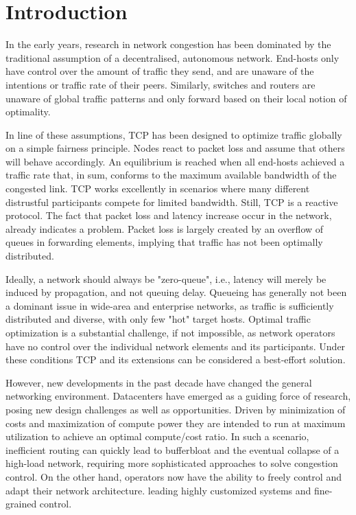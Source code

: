 \section{Introduction}
\label{sec:intro}

In the early years, research in network congestion has been dominated by the traditional assumption of a decentralised, autonomous network. End-hosts only have control over the amount of traffic they send, and are unaware of the intentions or traffic rate of their peers. Similarly, switches and routers are unaware of global traffic patterns and only forward based on their local notion of optimality.

In line of these assumptions, TCP has been designed to optimize traffic globally on a simple fairness principle. Nodes react to packet loss and assume that others will behave accordingly. An equilibrium is reached when all end-hosts achieved a traffic rate that, in sum, conforms to the maximum available bandwidth of the congested link.
TCP works excellently in scenarios where many different distrustful participants compete for limited bandwidth. Still, TCP is a reactive protocol. The fact that packet loss and latency increase occur in the network, already indicates a problem. Packet loss is largely created by an overflow of queues in forwarding elements, implying that traffic has not been optimally distributed. 

Ideally, a network should always be "zero-queue", i.e., latency will merely be induced by propagation, and not queuing delay. 
Queueing has generally not been a dominant issue in wide-area and enterprise networks, as traffic is sufficiently distributed and diverse, with only few "hot" target hosts. Optimal traffic optimization is a substantial challenge, if not impossible, as network operators have no control over the individual network elements and its participants. Under these conditions TCP and its extensions can be considered a best-effort solution. 

However, new developments in the past decade have changed the general networking environment. Datacenters have emerged as a guiding force of research, posing new design challenges as well as opportunities.
Driven by minimization of costs and maximization of compute power they are intended to run at maximum utilization to achieve an optimal compute/cost ratio. In such a scenario, inefficient routing can quickly lead to bufferbloat and the eventual collapse of a high-load network, requiring more sophisticated approaches to solve congestion control. 
On the other hand, operators now have the ability to freely control and adapt their network architecture. leading highly customized systems and fine-grained control. 

